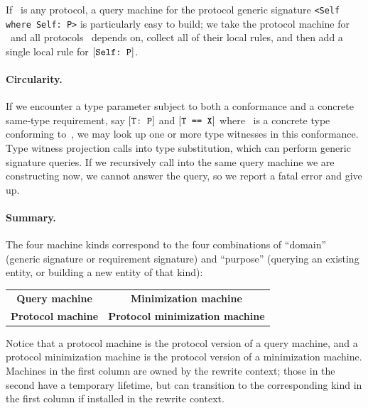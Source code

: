 \documentclass[../generics]{subfiles}
\begin{document}
\begin{example}
If \tP\ is any protocol, a query machine for the protocol generic signature \verb|<Self where Self: P>| is particularly easy to build; we take the protocol machine for \tP\ and all protocols \tP\ depends on, collect all of their local rules, and then add a single local rule for $[\texttt{Self:~P}]$.
\end{example}

\paragraph{Circularity.}
If we encounter a type parameter subject to both a conformance and a concrete same-type requirement, say $[\texttt{T:~P}]$ and $[\texttt{T == X}]$ where \tX\ is a concrete type conforming to~\tP, we may look up one or more type witnesses in this conformance. Type witness projection calls into type substitution, which can perform generic signature queries. If we recursively call into the same query machine we are constructing now, we cannot answer the query, so we report a fatal error and give up.

\paragraph{Summary.}
The four machine kinds correspond to the four combinations of ``domain'' (generic signature or requirement signature) and ``purpose'' (querying an existing entity, or building a new entity of that kind):
\begin{center}
\begin{tabular}{cc}
\toprule
\index{query machine!summary}\textbf{Query machine}&\index{minimization machine!summary}\textbf{Minimization machine}\\
\index{protocol machine!summary}\textbf{Protocol machine}&\index{protocol minimization machine!summary}\textbf{Protocol minimization machine}\\
\bottomrule
\end{tabular}
\end{center}
Notice that a protocol machine is the protocol version of a query machine, and a protocol minimization machine is the protocol version of a minimization machine. Machines in the first column are owned by the rewrite context; those in the second have a temporary lifetime, but can transition to the corresponding kind in the first column if  installed in the rewrite context.
\end{document}
